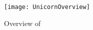 \begin{figure}[t!]
    \centering
    \texttt{[image: UnicornOverview]}
    \caption{\small {Overview of \ourapproach}}
    \vspace{-2em}
    \label{fig:overview}
\end{figure}
